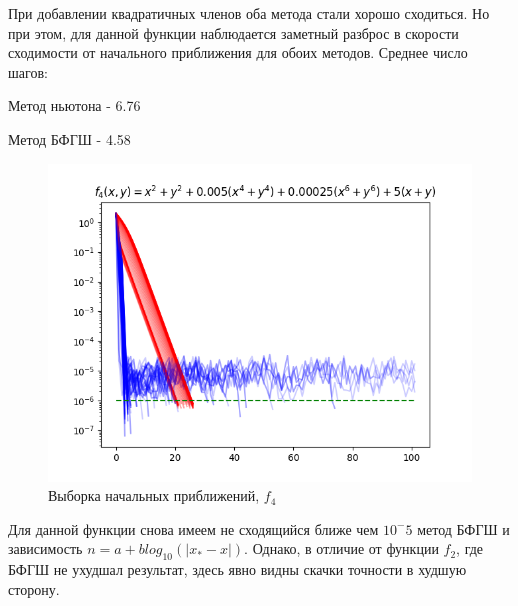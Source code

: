 При добавлении квадратичных членов оба метода стали хорошо сходиться.
Но при этом, для данной функции наблюдается заметный разброс в скорости сходимости от начального приближения для обоих методов.
Среднее число шагов:

Метод ньютона - 6.76

Метод БФГШ - 4.58

\begin{figure}[H]
			\centering
			\includegraphics[scale=0.75]{figures/init_100_func4}
			\caption{Выборка начальных приближений, $f_4$}
			\label{fig:init_100_func4}
\end{figure}

Для данной функции снова имеем не сходящийся ближе чем $10^-5$ метод БФГШ и зависимость $n = a+b log_10(|x_*-x|)$.
Однако, в отличие от функции $f_2$, где БФГШ не ухудшал результат, здесь явно видны скачки точности в худшую сторону.
